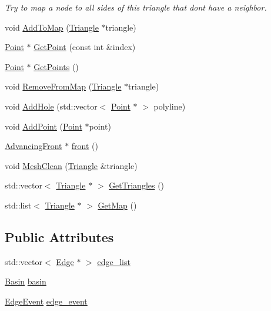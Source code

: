 \begin{DoxyCompactItemize}
\begin{DoxyCompactList}\small\item\em Try to map a node to all sides of this triangle that don\textquotesingle{}t have a neighbor. \end{DoxyCompactList}\item 
void \hyperlink{classp2t_1_1_sweep_context_a9ae8715f961ca7e61cc5a986f6afbe12}{Add\+To\+Map} (\hyperlink{classp2t_1_1_triangle}{Triangle} $\ast$triangle)
\item 
\hyperlink{structp2t_1_1_point}{Point} $\ast$ \hyperlink{classp2t_1_1_sweep_context_a72e8032e135d9cd6c44b2d93cbfbc033}{Get\+Point} (const int \&index)
\item 
\hyperlink{structp2t_1_1_point}{Point} $\ast$ \hyperlink{classp2t_1_1_sweep_context_ae37f1dcc28825cffc9a0a7509686167f}{Get\+Points} ()
\item 
void \hyperlink{classp2t_1_1_sweep_context_a7fb0c50ea27a52a1f912809404657f89}{Remove\+From\+Map} (\hyperlink{classp2t_1_1_triangle}{Triangle} $\ast$triangle)
\item 
void \hyperlink{classp2t_1_1_sweep_context_a728034555eeb9eb84651e6709869300e}{Add\+Hole} (std\+::vector$<$ \hyperlink{structp2t_1_1_point}{Point} $\ast$ $>$ polyline)
\item 
void \hyperlink{classp2t_1_1_sweep_context_a1197bffb2102eef7615a143ee5ce0437}{Add\+Point} (\hyperlink{structp2t_1_1_point}{Point} $\ast$point)
\item 
\hyperlink{classp2t_1_1_advancing_front}{Advancing\+Front} $\ast$ \hyperlink{classp2t_1_1_sweep_context_a38f01ceff16d463a0f1d60ca272cb89e}{front} ()
\item 
void \hyperlink{classp2t_1_1_sweep_context_a37a0e33f03be651567ae13cd65c25161}{Mesh\+Clean} (\hyperlink{classp2t_1_1_triangle}{Triangle} \&triangle)
\item 
std\+::vector$<$ \hyperlink{classp2t_1_1_triangle}{Triangle} $\ast$ $>$ \hyperlink{classp2t_1_1_sweep_context_ac714e672f00f408108089bcf07f8d9d2}{Get\+Triangles} ()
\item 
std\+::list$<$ \hyperlink{classp2t_1_1_triangle}{Triangle} $\ast$ $>$ \hyperlink{classp2t_1_1_sweep_context_a313ad6a03436268cfaa521846c57ac8a}{Get\+Map} ()
\end{DoxyCompactItemize}
\subsection*{Public Attributes}
\begin{DoxyCompactItemize}
\item 
std\+::vector$<$ \hyperlink{structp2t_1_1_edge}{Edge} $\ast$ $>$ \hyperlink{classp2t_1_1_sweep_context_ab5da3232dd8284254ecdedbec3047ea0}{edge\+\_\+list}
\item 
\hyperlink{structp2t_1_1_sweep_context_1_1_basin}{Basin} \hyperlink{classp2t_1_1_sweep_context_a79c599f974533a926b6a9ec73870e7d4}{basin}
\item 
\hyperlink{structp2t_1_1_sweep_context_1_1_edge_event}{Edge\+Event} \hyperlink{classp2t_1_1_sweep_context_a86a138afe29697cfcd33158ec59c663e}{edge\+\_\+event}
\end{DoxyCompactItemize}
